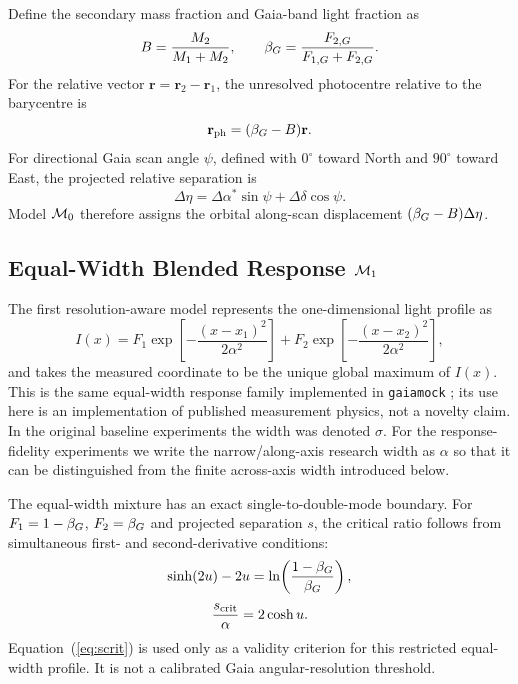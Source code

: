Define the secondary mass fraction and Gaia-band light fraction as
\begin{equation}
B=\frac{M_2}{M_1+M_2},\qquad
\beta_G=\frac{F_{2,G}}{F_{1,G}+F_{2,G}}.
\end{equation}
For the relative vector $\mathbf r=\mathbf r_2-\mathbf r_1$, the unresolved photocentre relative to the barycentre is
\begin{equation}
\mathbf r_{\rm ph}=(\beta_G-B)\mathbf r.
\label{eq:photocentre}
\end{equation}
For directional Gaia scan angle $\psi$, defined with $0^\circ$ toward North and $90^\circ$ toward East, the projected relative separation is
\begin{equation}
\Delta\eta=\Delta\alpha^\ast\sin\psi+\Delta\delta\cos\psi.
\label{eq:alproj}
\end{equation}
Model $\mathcal{M}_0$ therefore assigns the orbital along-scan displacement $(\beta_G-B)\Delta\eta$.

\subsection{Equal-Width Blended Response $\mathcal{M}_1$}

The first resolution-aware model represents the one-dimensional light profile as
\begin{equation}
I(x)=F_1\exp\!\left[-\frac{(x-x_1)^2}{2\alpha^2}\right]
+F_2\exp\!\left[-\frac{(x-x_2)^2}{2\alpha^2}\right],
\label{eq:gaussian}
\end{equation}
and takes the measured coordinate to be the unique global maximum of $I(x)$. This is the same equal-width response family implemented in \texttt{gaiamock} \citep{ElBadry2024}; its use here is an implementation of published measurement physics, not a novelty claim. In the original baseline experiments the width was denoted $\sigma$. For the response-fidelity experiments we write the narrow/along-axis research width as $\alpha$ so that it can be distinguished from the finite across-axis width introduced below.

The equal-width mixture has an exact single-to-double-mode boundary. For $F_1=1-\beta_G$, $F_2=\beta_G$ and projected separation $s$, the critical ratio follows from simultaneous first- and second-derivative conditions:
\begin{equation}
\sinh(2u)-2u=\ln\!\left(\frac{1-\beta_G}{\beta_G}\right),
\end{equation}
\begin{equation}
\frac{s_{\rm crit}}{\alpha}=2\cosh u.
\label{eq:scrit}
\end{equation}
Equation~(\ref{eq:scrit}) is used only as a validity criterion for this restricted equal-width profile. It is not a calibrated Gaia angular-resolution threshold.

